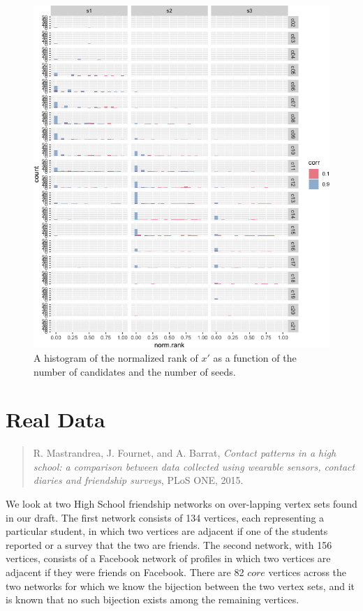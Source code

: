 \documentclass[
]{article}
\begin{document}
\begin{figure}
\centering
\includegraphics{vn_files/figure-latex/rank2-1.png}
\caption{A histogram of the normalized rank of \(x'\) as a function of
the number of candidates and the number of seeds.}
\end{figure}

\hypertarget{real-data}{%
\section{Real Data}\label{real-data}}

\begin{quote}
R. Mastrandrea, J. Fournet, and A. Barrat, \emph{Contact patterns in a
high school: a comparison between data collected using wearable sensors,
contact diaries and friendship surveys}, PLoS ONE, 2015.
\end{quote}

We look at two High School friendship networks on over-lapping vertex
sets found in our draft. The first network consists of 134 vertices,
each representing a particular student, in which two vertices are
adjacent if one of the students reported or a survey that the two are
friends. The second network, with 156 vertices, consists of a Facebook
network of profiles in which two vertices are adjacent if they were
friends on Facebook. There are 82 \(core\) vertices across the two
networks for which we know the bijection between the two vertex sets,
and it is known that no such bijection exists among the remaining
vertices.
\end{document}
